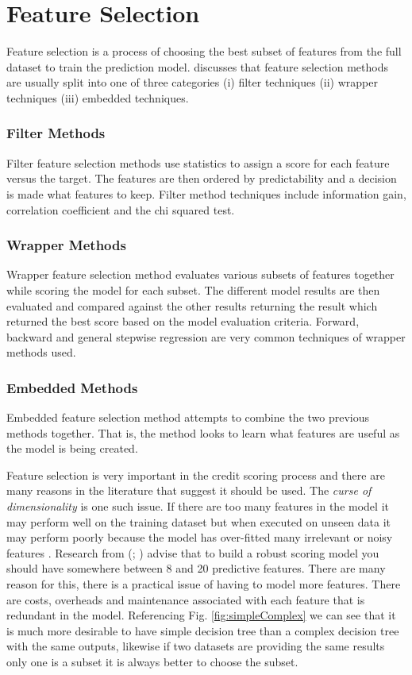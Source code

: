 \section{Feature Selection}\label{sec2:featureSection}
Feature selection is a process of choosing the best subset of features from the full dataset to train the prediction model. \cite{guyon_introduction_2003} discusses that feature selection methods are usually split into one of three categories (i) filter techniques (ii) wrapper techniques (iii) embedded techniques. 

\subsubsection{Filter Methods}
Filter feature selection methods use statistics to assign a score for each feature versus the target. The features are then ordered by predictability and a decision is made what features to keep. Filter method techniques include information gain, correlation coefficient and the chi squared test.

\subsubsection{Wrapper Methods}
Wrapper feature selection method evaluates various subsets of features together while scoring the model for each subset. The different model results are then evaluated and compared against the other results returning the result which returned the best score based on the model evaluation criteria. Forward, backward and general stepwise regression are very common techniques of wrapper methods used.

\subsubsection{Embedded Methods}
Embedded feature selection method attempts to combine the two previous methods together. That is, the method looks to learn what features are useful as the model is being created. 

Feature selection is very important in the credit scoring process and there are many reasons in the literature that suggest it should be used. The \textit{curse of dimensionality} is one such issue. If there are too many features in the model it may perform well on the training dataset but when executed on unseen data it may perform poorly because the model has over-fitted many irrelevant or noisy features \citep{loughrey_overfitting_2005}. Research from (\cite{thomas_consumer_2009}; \cite{mays_credit_2004})  advise that to build a robust scoring model you should have somewhere between 8 and 20 predictive features. There are many reason for this, there is a practical issue of having to model more features. There are costs, overheads and maintenance associated with each feature that is redundant in the model. Referencing Fig. \ref{fig:simpleComplex} we can see that it is much more desirable to have simple decision tree than a complex decision tree with the same outputs, likewise if two datasets are providing the same results only one is a subset it is always better to choose the subset. 

